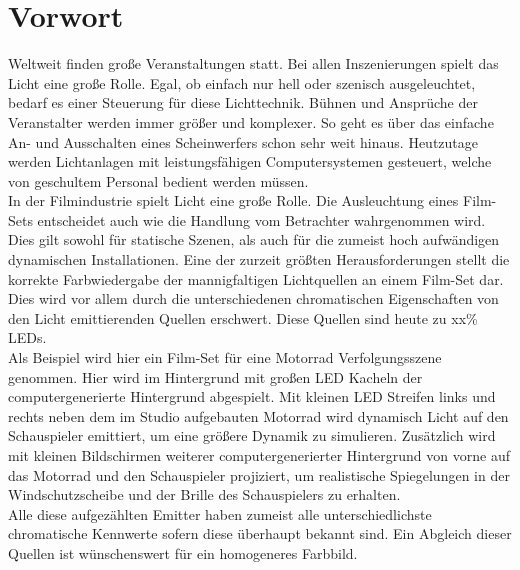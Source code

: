 \documentclass[11pt]{scrartcl}
\begin{document}
\section*{Vorwort}
Weltweit finden große Veranstaltungen statt. Bei allen Inszenierungen spielt das Licht eine 
große Rolle. Egal, ob einfach nur hell oder szenisch ausgeleuchtet, bedarf es einer Steuerung 
für diese Lichttechnik. Bühnen und Ansprüche der Veranstalter werden immer größer und komplexer. 
So geht es über das einfache An- und Ausschalten eines Scheinwerfers schon sehr weit hinaus. 
Heutzutage werden Lichtanlagen mit leistungsfähigen Computersystemen gesteuert, welche von 
geschultem Personal bedient werden müssen.\\
In der Filmindustrie spielt Licht eine große Rolle. Die Ausleuchtung eines Film-Sets entscheidet 
auch wie die Handlung vom Betrachter wahrgenommen wird. Dies gilt sowohl für statische Szenen, 
als auch für die zumeist hoch aufwändigen dynamischen Installationen.
Eine der zurzeit größten Herausforderungen stellt die korrekte Farbwiedergabe der mannigfaltigen 
Lichtquellen an einem Film-Set dar.
Dies wird vor allem durch die unterschiedenen chromatischen Eigenschaften von den Licht 
emittierenden Quellen erschwert. Diese Quellen sind heute zu {\color{red} xx}\% LEDs.\\
Als Beispiel wird hier ein Film-Set für eine Motorrad Verfolgungsszene genommen. Hier wird im 
Hintergrund mit großen LED Kacheln der computergenerierte Hintergrund abgespielt. Mit kleinen 
LED Streifen links und rechts neben dem im Studio aufgebauten Motorrad wird dynamisch Licht auf 
den Schauspieler emittiert, um eine größere Dynamik zu simulieren.
Zusätzlich wird mit kleinen Bildschirmen weiterer computergenerierter Hintergrund von vorne auf 
das Motorrad und den Schauspieler projiziert, um realistische Spiegelungen in der 
Windschutzscheibe und der Brille des Schauspielers zu erhalten.\\
Alle diese aufgezählten Emitter haben zumeist alle unterschiedlichste chromatische Kennwerte 
sofern diese überhaupt bekannt sind. Ein Abgleich dieser Quellen ist wünschenswert für ein 
homogeneres Farbbild.

\end{document}
